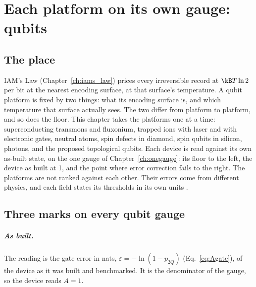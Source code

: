 \chapter{Each platform on its own gauge: qubits}\label{ch:qplatforms}

\section*{The place}
IAM's Law (Chapter~\ref{ch:iams_law}) prices every irreversible record at $\kB T\ln2$ per bit at the nearest encoding surface, at that
surface's temperature. A qubit platform is fixed by two things: what its encoding surface is, and which temperature that surface
actually sees. The two differ from platform to platform, and so does the floor. This chapter takes the platforms one at a time:
superconducting transmons and fluxonium, trapped ions with laser and with electronic gates, neutral atoms, spin defects in diamond,
spin qubits in silicon, photons, and the proposed topological qubits. Each device is read against its own as-built state, on the
one gauge of Chapter~\ref{ch:onegauge}: its floor to the left, the device as built at 1, and the point where error correction fails
to the right. The platforms are not ranked against each other. Their errors come from different physics, and each field states its
thresholds in its own units \interp.

\section{Three marks on every qubit gauge}\label{sec:qp_marks}
\paragraph{As built.} The reading is the gate error in nats, $\varepsilon=-\ln(1-p_{2Q})$ (Eq.~\eqref{eq:Agate}), of the device as
it was built and benchmarked. It is the denominator of the gauge, so the device reads $A=1$.

